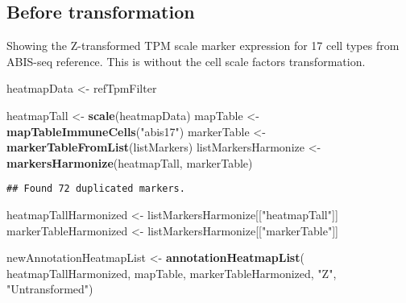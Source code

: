 \documentclass[
]{article}
\newenvironment{Shaded}{\begin{snugshade}}{\end{snugshade}}
\newcommand{\FunctionTok}[1]{\textcolor[rgb]{0.13,0.29,0.53}{\textbf{#1}}}
\newcommand{\NormalTok}[1]{#1}
\newcommand{\OtherTok}[1]{\textcolor[rgb]{0.56,0.35,0.01}{#1}}
\newcommand{\StringTok}[1]{\textcolor[rgb]{0.31,0.60,0.02}{#1}}
\begin{document}
\hypertarget{before-transformation}{%
\subsection{Before transformation}\label{before-transformation}}

Showing the Z-transformed TPM scale marker expression for 17 cell types
from ABIS-seq reference. This is without the cell scale factors
transformation.

\begin{Shaded}
\begin{Highlighting}[]
\NormalTok{heatmapData }\OtherTok{\textless{}{-}}\NormalTok{ refTpmFilter}
\end{Highlighting}
\end{Shaded}

\begin{Shaded}
\begin{Highlighting}[]
\NormalTok{heatmapTall }\OtherTok{\textless{}{-}} \FunctionTok{scale}\NormalTok{(heatmapData)}
\NormalTok{mapTable }\OtherTok{\textless{}{-}} \FunctionTok{mapTableImmuneCells}\NormalTok{(}\StringTok{"abis17"}\NormalTok{)}
\NormalTok{markerTable }\OtherTok{\textless{}{-}} \FunctionTok{markerTableFromList}\NormalTok{(listMarkers)}
\NormalTok{listMarkersHarmonize }\OtherTok{\textless{}{-}} \FunctionTok{markersHarmonize}\NormalTok{(heatmapTall, markerTable)}
\end{Highlighting}
\end{Shaded}

\begin{verbatim}
## Found 72 duplicated markers.
\end{verbatim}

\begin{Shaded}
\begin{Highlighting}[]
\NormalTok{heatmapTallHarmonized }\OtherTok{\textless{}{-}}\NormalTok{ listMarkersHarmonize[[}\StringTok{"heatmapTall"}\NormalTok{]]}
\NormalTok{markerTableHarmonized }\OtherTok{\textless{}{-}}\NormalTok{ listMarkersHarmonize[[}\StringTok{"markerTable"}\NormalTok{]]}
\end{Highlighting}
\end{Shaded}

\begin{Shaded}
\begin{Highlighting}[]
\NormalTok{newAnnotationHeatmapList }\OtherTok{\textless{}{-}} \FunctionTok{annotationHeatmapList}\NormalTok{(}
\NormalTok{  heatmapTallHarmonized, mapTable, markerTableHarmonized, }\StringTok{"Z"}\NormalTok{, }\StringTok{"Untransformed"}\NormalTok{)}
\end{Highlighting}
\end{Shaded}
\end{document}
